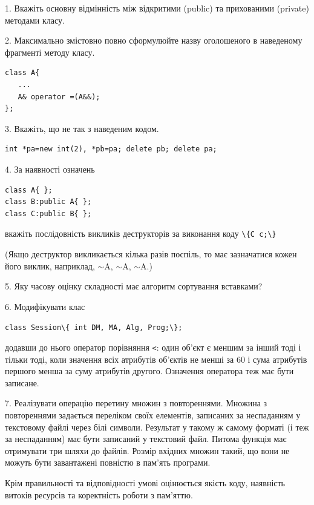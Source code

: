 \documentclass[12pt, ukrainian]{article}
\def\code#1{\Verb!#1!}
\begin{document}
{%
1. Вкажіть основну відмінність між відкритими (public) та прихованими (private) методами класу.%
\par
\vspace{2mm}
2. Максимально змістовно повно сформулюйте назву оголошеного в наведеному фрагменті методу класу.
\vspace{-3mm}
\begin{verbatim}class A{
   ...
   A& operator =(A&&);
};\end{verbatim}
\vspace{-3mm}
\par
\vspace{2mm}
3. Вкажіть, що не так з наведеним кодом.
\vspace{-3mm}
\begin{verbatim}int *pa=new int(2), *pb=pa; delete pb; delete pa;\end{verbatim}
\vspace{-3mm}
\par
\vspace{2mm}
4. За наявності означень
\vspace{-3mm}
\begin{verbatim}
class A{ };
class B:public A{ };
class C:public B{ };\end{verbatim}
\vspace{-3mm}
вкажіть послідовність викликів деструкторів за виконання коду \code{\{C c;\}} 

(Якщо деструктор викликається кілька разів поспіль, то має зазначатися кожен його виклик, наприклад, $\sim$A, $\sim$A, $\sim$A.)

\vspace{2mm}
5. Яку часову оцінку складності має алгоритм сортування вставками?
\par
\vspace{2mm}
6. Модифікувати клас 

\qquad\code{class Session\{ int DM, MA, Alg, Prog;\};} 


додавши до нього оператор порівняння \code{<}: один об'єкт є меншим за інший тоді і тільки тоді, коли значення всіх атрибутів об'єктів не менші за 60 і сума атрибутів першого менша за суму атрибутів другого. Означення оператора теж має бути записане.%
\par
\vspace{2mm}
7. 
Реалізувати операцію перетину множин з повтореннями. Множина з повтореннями задається переліком своїх елементів, записаних за неспаданням у текстовому файлі через білі символи. Результат у такому ж самому форматі (і теж за неспаданням) має бути записаний у текстовий файл. Питома функція має отримувати три шляхи до файлів. Розмір вхідних множин такий, що вони не можуть бути завантажені повністю в пам’ять програми.

Крім правильності та відповідності умові оцінюється якість коду, наявність витоків ресурсів та коректність роботи з пам'яттю. 

}
\end{document}
